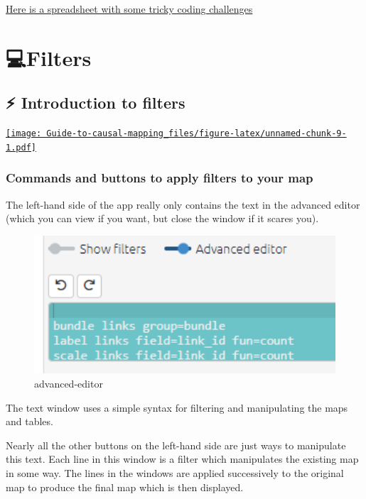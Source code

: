 \documentclass[
]{book}
\begin{document}
\href{https://docs.google.com/spreadsheets/d/1aRCKmuLO3rJR5gXo6-hW_WuOHRAJQ-DzJsUdgO44JCE/edit\#gid=0}{Here is a spreadsheet with some tricky coding challenges}

\hypertarget{part-filters}{%
\part{💻Filters}\label{part-filters}}

\hypertarget{xintro-filters}{%
\chapter{⚡ Introduction to filters}\label{xintro-filters}}

\href{https://player.vimeo.com/video/618270513}{\texttt{[image: Guide-to-causal-mapping\_files/figure-latex/unnamed-chunk-9-1.pdf]}}

\hypertarget{commands-and-buttons-to-apply-filters-to-your-map-1}{%
\section{Commands and buttons to apply filters to your map}\label{commands-and-buttons-to-apply-filters-to-your-map-1}}

The left-hand side of the app really only contains the text in the advanced editor (which you can view if you want, but close the window if it scares you).

\begin{figure}
\centering
\includegraphics[width=6.77083in,height=\textheight]{_assets/image-20210914103354673.png}
\caption{advanced-editor}
\end{figure}

The text window uses a simple syntax for filtering and manipulating the maps and tables.

Nearly all the other buttons on the left-hand side are just ways to manipulate this text. Each line in this window is a filter which manipulates the existing map in some way. The lines in the windows are applied successively to the original map to produce the final map which is then displayed.
\end{document}
